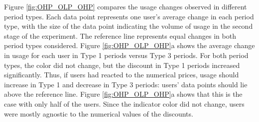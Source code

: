 Figure \ref{fig:OHP_OLP_OHP} compares the usage changes observed in different period types. Each data point represents one user's average change in each period type, with the size of the data point indicating the volume of usage in the second stage of the experiment.  The reference line represents equal changes in both period types considered. Figure \ref{fig:OHP_OLP_OHP}a shows the average change in usage for each user in Type 1 periods versus Type 3 periods.  For both period types, the color did not change, but the discount in Type 1 periods increased significantly.  Thus, if users had reacted to the numerical prices, usage should increase in Type 1 and decrease in Type 3 periods: users' data points should lie above the reference line.  Figure \ref{fig:OHP_OLP_OHP}a shows that this is the case with only half of the users.  Since the indicator color did not change, users were mostly agnostic to the numerical values of the discounts.
